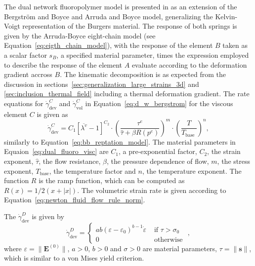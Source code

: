 The dual network fluoropolymer model is presented in \cite{bergstromConstitutiveModelPredicting2005} as an extension of the Bergström and Boyce \citep{bergstromConstitutiveModelingLarge1998} and Arruda and Boyce model, generalizing the Kelvin-Voigt representation of the Burgers material.
The response of both springs is given by the Arruda-Boyce eight-chain model (see Equation~\eqref{eq:eigth_chain_model}), with the response of the element $B$ taken as a scalar factor $s_B$, a specified material parameter, times the expression employed to describe the response of the element $A$ evaluate according to the deformation gradient accross $B$.
The kinematic decomposition is as expected from the discussion in sections~\ref{sec:generalization_large_strains_3d} and \ref{sec:inclusion_thermal_field} including a thermal deformation gradient.
The rate equations for $\dot\gamma^C_\text{dev}$ and $\dot\gamma^C_\text{vol}$ in Equation~\eqref{eq:d_w_bergstrom} for the viscous element $C$ is given as
\begin{equation}
	\label{eq:dual_fluoro_visc}
	\dot{\gamma}^C_{\mathrm{dev}}=C_1\left[\overline{\lambda^v}-1\right]^{C_2} \cdot\left(\frac{\tau^e}{\hat\tau+\beta R\left(p^e\right)}\right)^m \cdot\left(\frac{T}{T_{\text {base }}}\right)^n,
\end{equation}
similarly to Equation~\eqref{eq:bb_reptation_model}.
The material parameters in Equaion~\eqref{eq:dual_fluoro_visc} are $C_1$, a pre-exponential factor, $C_2$, the strain exponent, $\hat \tau$, the flow resistance, $\beta$, the pressure dependence of flow, $m$, the stress exponent, $T_\text{base}$, the temperature factor and $n$, the temperature exponent.
The function $R$ is the ramp function, which can be computed as $R(x) = 1/2(x + |x|)$.
The volumetric strain rate is given according to Equation~\eqref{eq:newton_fluid_flow_rule_norm}.

The $\dot \gamma^D_\text{dev}$ is given by
\begin{equation}
	\dot{\gamma}_\text{dev}^D=\begin{cases}
	a b\left(\varepsilon-\varepsilon_0\right)^{b-1} \dot{\varepsilon} & \text { if } \tau>\sigma_0 \\
	0 & \text { otherwise }
	\end{cases},
\end{equation}
where $\varepsilon = \|\mathbf E^{(0)}\|$, $a >0$, $b>0$ and $\sigma>0$ are material parameters, $\tau = \|\mathbf s\|$, which is similar to a von Mises yield criterion.


